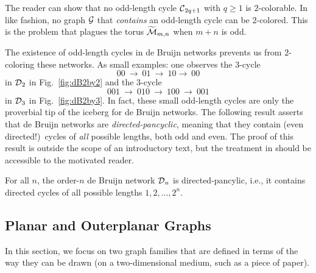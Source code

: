 The reader can show that no odd-length cycle $\mbox{$\cal C$}_{2q+1}$ with $q \geq
1$ is $2$-colorable.  In like fashion, no graph $\mbox{$\cal G$}$ that {\em
contains} an odd-length cycle can be $2$-colored.  This is the
problem that plagues the torus $\widetilde{\mbox{$\cal M$}}_{m,n}$ when $m+n$ is odd.

The existence of odd-length cycles in de Bruijn networks prevents us from 
$2$-coloring these networks.  As small examples: one observes the $3$-cycle
\[ 00 \ \rightarrow \ 01 \ \rightarrow \ 10  \rightarrow \ 00 \]
in $\mbox{$\cal D$}_2$ in Fig.~\ref{fig:dB2by2} and the $3$-cycle
\[ 001 \ \rightarrow \ 010 \ \rightarrow \ 100 \ \rightarrow \ 001 \]
in $\mbox{$\cal D$}_3$ in Fig.~\ref{fig:dB2by3}.  In fact, these small odd-length
cycles are only the proverbial tip of the iceberg for de Bruijn
networks.  The following result asserts that de Bruijn networks are
{\it directed-pancyclic},  
 
meaning that they contain (even directed!)~cycles of {\em all}
possible lengths, both odd and even.  The proof of this result is
outside the scope of an introductory text, but the treatment in \cite{Yoeli62}
should be accessible to the motivated reader.

\begin{prop}{\cite{Yoeli62}}
For all $n$, the order-$n$ de Bruijn
network $\mbox{$\cal D$}_n$ is directed-pancylic, i.e., it
contains directed cycles of all possible lengths $1, 2, \ldots, 2^n$.
\end{prop}

\subsection{Planar and Outerplanar Graphs}
\label{sec:planar+outerplanar-color}

In this section, we focus on two graph families that are defined in
terms of the way they can be drawn (on a two-dimensional medium, such
as a piece of paper).
\bigskip

\noindent {}
\bigskip


